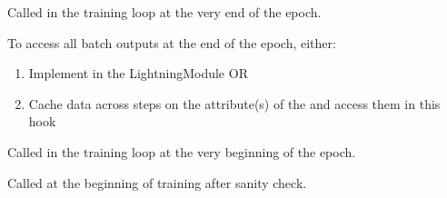 \documentclass[letterpaper,10pt,english]{sphinxmanual}
\begin{document}
\begin{fulllineitems}
\begin{fulllineitems}
\label{\detokenize{pages/ml:vipercore.ml.plmodels.MultilabelSupervisedModel.on_train_epoch_end}}
\sphinxAtStartPar
Called in the training loop at the very end of the epoch.

\sphinxAtStartPar
To access all batch outputs at the end of the epoch, either:
\begin{enumerate}
%
\item {} 
\sphinxAtStartPar
Implement  in the LightningModule OR

\item {} 
\sphinxAtStartPar
Cache data across steps on the attribute(s) of the  and access them in this hook

\end{enumerate}

\end{fulllineitems}


\begin{fulllineitems}
\label{\detokenize{pages/ml:vipercore.ml.plmodels.MultilabelSupervisedModel.on_train_epoch_start}}
\sphinxAtStartPar
Called in the training loop at the very beginning of the epoch.

\end{fulllineitems}


\begin{fulllineitems}
\label{\detokenize{pages/ml:vipercore.ml.plmodels.MultilabelSupervisedModel.on_train_start}}
\sphinxAtStartPar
Called at the beginning of training after sanity check.

\end{fulllineitems}



\end{fulllineitems}
\end{document}

